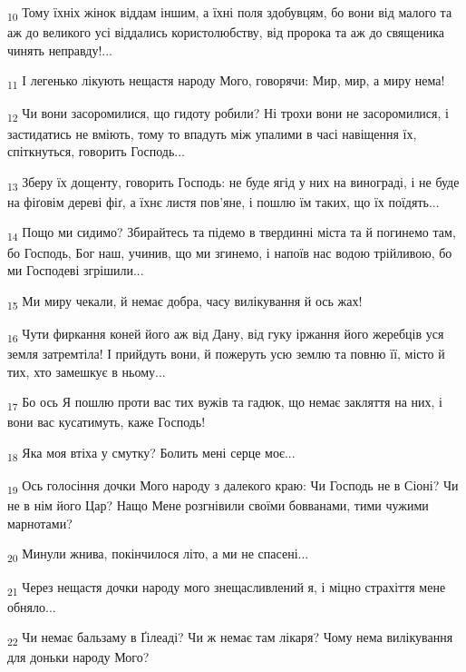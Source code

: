 \begin{tcolorbox}
\textsubscript{10} Тому їхніх жінок віддам іншим, а їхні поля здобувцям, бо вони від малого та аж до великого усі віддались користолюбству, від пророка та аж до священика чинять неправду!...
\end{tcolorbox}
\begin{tcolorbox}
\textsubscript{11} І легенько лікують нещастя народу Мого, говорячи: Мир, мир, а миру нема!
\end{tcolorbox}
\begin{tcolorbox}
\textsubscript{12} Чи вони засоромилися, що гидоту робили? Ні трохи вони не засоромилися, і застидатись не вміють, тому то впадуть між упалими в часі навіщення їх, спіткнуться, говорить Господь...
\end{tcolorbox}
\begin{tcolorbox}
\textsubscript{13} Зберу їх дощенту, говорить Господь: не буде ягід у них на винограді, і не буде на фіґовім дереві фіґ, а їхнє листя пов'яне, і пошлю їм таких, що їх поїдять...
\end{tcolorbox}
\begin{tcolorbox}
\textsubscript{14} Пощо ми сидимо? Збирайтесь та підемо в твердинні міста та й погинемо там, бо Господь, Бог наш, учинив, що ми згинемо, і напоїв нас водою трійливою, бо ми Господеві згрішили...
\end{tcolorbox}
\begin{tcolorbox}
\textsubscript{15} Ми миру чекали, й немає добра, часу вилікування й ось жах!
\end{tcolorbox}
\begin{tcolorbox}
\textsubscript{16} Чути фиркання коней його аж від Дану, від гуку іржання його жеребців уся земля затремтіла! І прийдуть вони, й пожеруть усю землю та повню її, місто й тих, хто замешкує в ньому...
\end{tcolorbox}
\begin{tcolorbox}
\textsubscript{17} Бо ось Я пошлю проти вас тих вужів та гадюк, що немає закляття на них, і вони вас кусатимуть, каже Господь!
\end{tcolorbox}
\begin{tcolorbox}
\textsubscript{18} Яка моя втіха у смутку? Болить мені серце моє...
\end{tcolorbox}
\begin{tcolorbox}
\textsubscript{19} Ось голосіння дочки Мого народу з далекого краю: Чи Господь не в Сіоні? Чи не в нім його Цар? Нащо Мене розгнівили своїми бовванами, тими чужими марнотами?
\end{tcolorbox}
\begin{tcolorbox}
\textsubscript{20} Минули жнива, покінчилося літо, а ми не спасені...
\end{tcolorbox}
\begin{tcolorbox}
\textsubscript{21} Через нещастя дочки народу мого знещасливлений я, і міцно страхіття мене обняло...
\end{tcolorbox}
\begin{tcolorbox}
\textsubscript{22} Чи немає бальзаму в Ґілеаді? Чи ж немає там лікаря? Чому нема вилікування для доньки народу Мого?
\end{tcolorbox}
